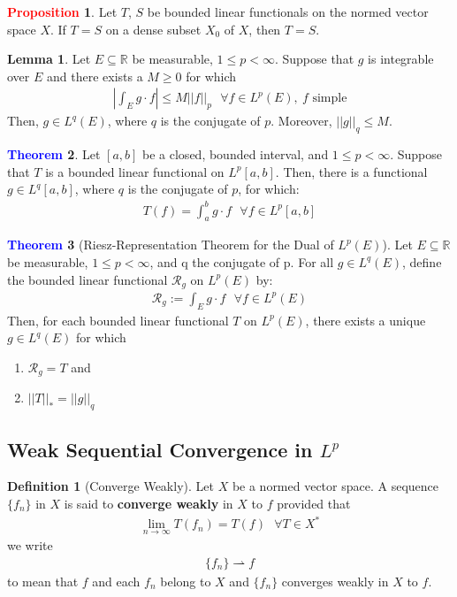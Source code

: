 \documentclass[11pt]{article}
\theoremstyle{definition}
\theoremstyle{definition}
\newcommand{\R}[0]{\mathbb{R}}
\newcommand{\EinR}[0]{Let $E \subseteq \R$ be measurable}
\newcommand{\idx}[2]{\int_{#1}^{#2}}
\newcommand{\warrow}[0]{\rightharpoonup}
\newtheorem{theorem}{\textcolor{blue}{Theorem}}
\newtheorem{lemma}[theorem]{Lemma}
\theoremstyle{definition}
\newtheorem{definition}{\textcolor{OliveGreen}{Definition}}
\newtheorem{prop}{\textcolor{red}{Proposition}}
\theoremstyle{remark}
\begin{document}
\begin{prop}
	Let $T$, $S$ be bounded linear functionals on the normed vector space $X$. If $T=S$ on a dense subset $X_0$ of $X$, then $T=S$. 
\end{prop}

\begin{lemma}
	\EinR, $1 \leq p < \infty$. Suppose that $g$ is integrable over $E$ and there exists a $M \geq 0$ for which 
	\begin{align*}
		\left| 		\int_E g \cdot f \right| \leq M || f||_p 	\text{ 		} \forall f \in L^p(E),\ f \text{ simple} 
	\end{align*}
	Then, $g \in L^q(E)$, where $q$ is the conjugate of $p$. Moreover, $||g||_q \leq M$. 
\end{lemma}

\begin{theorem}
	Let $[a,b]$ be a closed, bounded interval, and $1 \leq p < \infty$. Suppose that $T$ is a bounded linear functional on $L^p[a,b]$. Then, there is a functional $g \in L^q[a,b]$, where $q$ is the conjugate of $p$, for which: 
	\begin{align}
		T(f)= \idx{a}{b} g \cdot f \text{ 	} \forall f \in L^p[a,b] 
	\end{align}
\end{theorem}

\begin{theorem}[Riesz-Representation Theorem for the Dual of $L^p(E)$] 
	\EinR, $1 \leq p < \infty$, and q the conjugate of p. For all $g \in L^q(E)$, define the bounded linear functional $\mathcal{R}_g$ on $L^p(E)$ by: 
	\begin{align}
		\mathcal{R}_g := \idx{E}{} g \cdot f \text{ 		} \forall f \in L^p(E) 
	\end{align}
	Then, for each bounded linear functional $T$ on $L^p(E)$, there exists a unique $g \in L^q(E)$ for which 
	\begin{enumerate}[noitemsep]
		\item $\mathcal{R}_g = T$ and 
		\item $||T||_* = ||g||_q$
	\end{enumerate}
\end{theorem}

\subsection{Weak Sequential Convergence in $L^p$}

\begin{definition}[Converge Weakly]
	Let $X$ be a normed vector space. A sequence $\{ f_n \}$ in $X$ is said to \textbf{converge weakly} in $X$ to $f$ provided that 
	\begin{align}
		\lim_{n \rightarrow \infty} T(f_n) = T(f) \text{ 		} \forall T \in X^* 
	\end{align}
	we write 
	\begin{align*}
		\{ f_n \} \warrow f 
	\end{align*}
	to mean that $f$ and each $f_n$ belong to $X$ and $\{ f_n \}$ converges weakly in $X$ to $f$. 
\end{definition}
\end{document}
